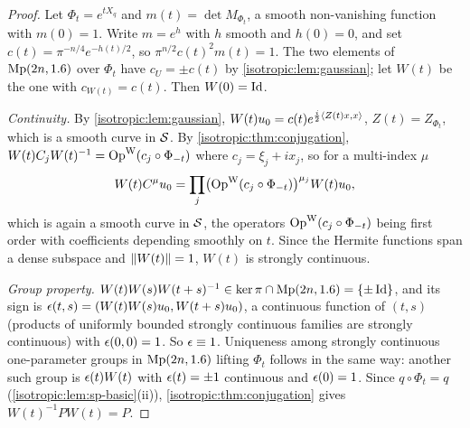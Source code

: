 \begin{proof}
Let $\Phi_t=e^{tX_q}$ and $m(t)=\det M_{\Phi_t}$, a smooth non-vanishing
function with $m(0)=1$. Write $m=e^h$ with $h$ smooth and $h(0)=0$, and set
$c(t)=\pi^{-n/4}e^{-h(t)/2}$, so $\pi^{n/2}c(t)^2m(t)=1$. The two elements of
$\mathrm{Mp}(2n,1.6)$ over $\Phi_t$ have $c_U=\pm c(t)$ by
\cref{isotropic:lem:gaussian}; let $W(t)$ be the one with $c_{W(t)}=c(t)$.
Then $W(0)=\operatorname{Id}$.

\emph{Continuity.} By \cref{isotropic:lem:gaussian},
$W(t)u_0=c(t)e^{\frac i2\langle Z(t)x, x\rangle}$, $Z(t)=Z_{\Phi_t}$, which is a smooth
curve in $\mathcal{S}$. By \cref{isotropic:thm:conjugation},
$W(t)C_jW(t)^{-1}=\operatorname{Op}^{\mathrm{W}}(c_j\circ\Phi_{-t})$ where $c_j=\xi_j+ix_j$, so for a
multi-index $\mu$
\begin{equation}\label{isotropic:eq:W-hermite}
  W(t)C^\mu u_0=\prod_j\bigl(\operatorname{Op}^{\mathrm{W}}(c_j\circ\Phi_{-t})\bigr)^{\mu_j}W(t)u_0,
\end{equation}
which is again a smooth curve in $\mathcal{S}$, the operators $\operatorname{Op}^{\mathrm{W}}(c_j\circ\Phi_{-t})$
being first order with coefficients depending smoothly on $t$. Since the
Hermite functions span a dense subspace and $\lVert W(t)\rVert=1$, $W(t)$ is strongly
continuous.

\emph{Group property.} $W(t)W(s)W(t+s)^{-1}\in\ker\pi\cap\mathrm{Mp}(2n,1.6)=\{\pm\operatorname{Id}\}$,
and its sign is $\epsilon(t,s)=(W(t)W(s)u_0,W(t+s)u_0)$, a continuous function of
$(t,s)$ (products of uniformly bounded strongly continuous families are
strongly continuous) with $\epsilon(0,0)=1$. So $\epsilon\equiv1$. Uniqueness among
strongly continuous one-parameter groups in $\mathrm{Mp}(2n,1.6)$ lifting
$\Phi_t$ follows in the same way: another such group is $\epsilon(t)W(t)$ with
$\epsilon(t)=\pm1$ continuous and $\epsilon(0)=1$. Since $q\circ\Phi_t=q$
(\cref{isotropic:lem:sp-basic}(ii)), \cref{isotropic:thm:conjugation} gives
$W(t)^{-1}PW(t)=P$.


\end{proof}
